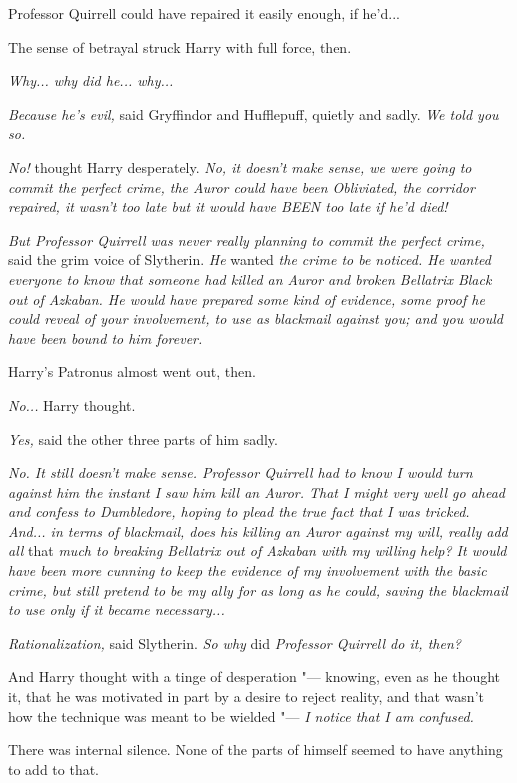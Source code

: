 Professor Quirrell could have repaired it easily enough, if he'd...

The sense of betrayal struck Harry with full force, then.

\emph{Why... why did he... why...}

\emph{Because he's evil,} said Gryffindor and Hufflepuff, quietly and
sadly. \emph{We told you so.}

\emph{No!} thought Harry desperately. \emph{No, it doesn't make sense,
we were going to commit the perfect crime, the Auror could have been
Obliviated, the corridor repaired, it wasn't too late but it would have
BEEN too late if he'd died!}

\emph{But Professor Quirrell was never really planning to commit the
perfect crime,} said the grim voice of Slytherin. \emph{He} wanted
\emph{the crime to be noticed. He wanted everyone to know that someone
had killed an Auror and broken Bellatrix Black out of Azkaban. He would
have prepared some kind of evidence, some proof he could reveal of your
involvement, to use as blackmail against you; and you would have been
bound to him forever.}

Harry's Patronus almost went out, then.

\emph{No...} Harry thought.

\emph{Yes,} said the other three parts of him sadly.

\emph{No. It still doesn't make sense. Professor Quirrell had to know I
would turn against him the instant I saw him kill an Auror. That I might
very well go ahead and confess to Dumbledore, hoping to plead the true
fact that I was tricked. And... in terms of blackmail, does his
killing an Auror against my will, really add all} that \emph{much to
breaking Bellatrix out of Azkaban with my willing help? It would have
been more cunning to keep the evidence of my involvement with the basic
crime, but still pretend to be my ally for as long as he could, saving
the blackmail to use only if it became necessary...}

\emph{Rationalization,} said Slytherin. \emph{So why} did
\emph{Professor Quirrell do it, then?}

And Harry thought with a tinge of desperation "--- knowing, even as he
thought it, that he was motivated in part by a desire to reject reality,
and that wasn't how the technique was meant to be wielded "--- \emph{I
notice that I am confused.}

There was internal silence. None of the parts of himself seemed to have
anything to add to that.

